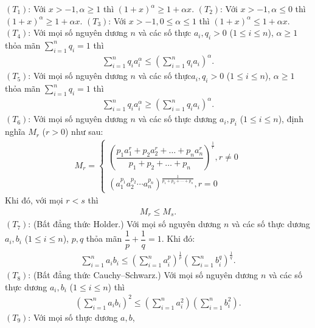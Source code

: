 \begin{multicols}{2}
{		\vskip 0.1cm
		$(T_1)$: Với $x>-1,\alpha \geq 1$ thì $(1+x)^{\alpha} \geq 1+\alpha x.$
		\vskip 0.1cm
		$(T_2)$: Với $x>-1,\alpha \leq 0$ thì
		$(1+x)^{\alpha} \geq 1+\alpha x.$
		\vskip 0.1cm
		$(T_3)$: Với $x>-1,0 \le \alpha \le 1$ thì
		$(1+x)^{\alpha} \le 1+\alpha x.$
		\vskip 0.1cm
		$(T_4)$: Với mọi số nguyên dương $n$ và các số thực $a_i,q_i>0$ ($1\le i \le n$), $ \alpha \geq 1$ thỏa mãn  $\sum_{i=1}^n q_i=1$ thì
		\begin{align*}
			\sum_{i=1}^n q_i a_i^{\alpha} \leq \left(\sum_{i=1}^n q_i a_i
			\right)^{\alpha}.
		\end{align*}
		$(T_5)$: Với mọi số nguyên dương $n$ và các số thực$a_i,q_i>0$ ($1\le i \le n$), $ \alpha \geq 1$ thỏa  mãn  $\sum_{i=1}^n q_i=1$ thì
		\begin{align*}
			\sum_{i=1}^n q_i a_i^{\alpha} \geq \left(\sum_{i=1}^n q_i a_i
			\right)^{\alpha}.
		\end{align*}
		$(T_6)$: Với mọi số nguyên dương $n$ và các số thực dương $a_i,p_i$ ($1\le i \le n$), định nghĩa $M_r$ ($r>0$) như sau:
		\begin{align*}
			M_{r}\!=\!\begin{cases}
				\!\!\left(\dfrac{p_{1} a_{1}^{r}+p_{2} a_{2}^{r}+\ldots+p_{n} a_{n}^{r}}{p_{1}+p_{2}+\ldots+p_{n}}\right)^{\frac{1}{r}}\!\!\!\!, r \neq 0 \\[+1ex]
				\left(a_{1}^{p_{1}} a_{2}^{p_{2}} \cdots a_{n}^{p_{n}}\right)^{\frac{1}{p_{1}+p_{2}+\cdots+p_{n}}}, r=0
			\end{cases}
		\end{align*}
		Khi đó, với mọi $r<s$ thì
		\begin{align*}
			M_{r} \leq M_{s}.
		\end{align*}
		$(T_7)$: (Bất đẳng thức Holder.) Với mọi số nguyên dương $n$ và các số thực dương $a_i,b_i$ ($1\le i \le n$), $p,q$ thỏa mãn $\dfrac{1}{p}+\dfrac{1}{q}=1.$ Khi đó:
		\begin{align*}
			\sum_{i=1}^{n} a_{i} b_{i} \leq\left(\sum_{i=1}^{n} a_{i}^{p}\right)^{\frac{1}{p}}\left(\sum_{i=1}^{n} b_{i}^{q}\right)^{\frac{1}{q}}.
		\end{align*}
		$(T_8)$: (Bất đẳng thức Cauchy--Schwarz.) Với mọi số nguyên dương $n$ và các số thực dương $a_i,b_i$ ($1\le i \le n$) thì
		\begin{align*}
			\left(\sum_{i=1}^{n} a_{i} b_{i}\right)^{2} \leq\left(\sum_{i=1}^{n} a_{i}^{2}\right)\left(\sum_{i=1}^{n} b_{i}^{2}\right).
		\end{align*}
		$(T_{9})$: Với mọi số thực dương $a,b$,
		\begin{align*}

\end{align*}}
\end{multicols}
